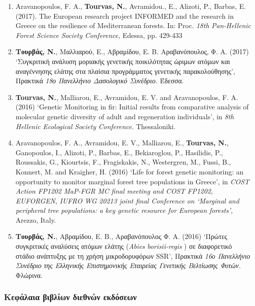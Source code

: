 \documentclass[12pt,]{scrartcl}
\begin{document}
\begin{enumerate}
\leftskip-0.07in  
\item {Aravanopoulos, F. Α., \textbf{Tourvas, N.}, Avramidou., E., Alizoti, P., Barbas, E. (2017). The European research project INFORMED and the research in Greece on the resilience of Mediterranean forests. In: Proc. \textit{18th Pan-Hellenic Forest Science Society Conference,} Edessa, pp. 429-433}
 
\leftskip-0.07in  
\item {\textbf{Τουρβάς, Ν.}, Μαλλιαρού, E., Αβραμίδου, Ε. Β. Αραβανόπουλος, Φ. Α. (2017) ‘Συγκριτική ανάλυση μοριακής γενετικής ποικιλότητας ώριμων ατόμων και αναγέννησης ελάτης στα πλαίσια προγράμματος γενετικής παρακολούθησης’, Πρακτικά \textit{18ο Πανελλήνιο Δασολογικό Συνέδριο.} Έδεσσα.}

\leftskip-0.07in  
\item {\textbf{Tourvas, N.}, Malliarou, E., Avramidou, E. V. and Aravanopoulos, F. A. (2016) ‘Genetic Monitoring in fir: Initial results from comparative analysis of molecular genetic diversity of adult and regeneration individuals’, in \textit{8th Hellenic Ecological Society Conference.} Thessaloniki.}

\leftskip-0.07in  
\item {Aravanopoulos, F. A., Avramidou, E. V., Malliarou, E., \textbf{Tourvas, N.}, Ganopoulos, I., Alizoti, P., Barbas, E., Bekiaroglou, P., Hasilidis, P., Roussakis, G., Kiourtsis, F., Fragiskakis, N., Westergren, M., Fussi, B., Konnert, M. and Kraigher, H. (2016) ‘Life for forest genetic monitoring: an opportunity to monitor marginal forest tree populations in Greece’, in \textit{COST Action FP1202 MaP-FGR MC final meeting and COST FP1202, EUFORGEN, IUFRO WG 20213 joint final Conference on ‘Marginal and peripheral tree populations: a key genetic resource for European forests’,} Arezzo, Italy.}

\leftskip-0.07in  
\item {\textbf{Τουρβάς, Ν.}, Αβραμίδου, Ε. Β., Αραβανόπουλος Φ. Α. (2016) ‘Πρώτες συγκριτικές αναλύσεις ατόμων ελάτης (\textit{Abies borisii-regis}
) σε διαφορετικό στάδιο ανάπτυξης με τη χρήση μικροδορυφόρων SSR’, Πρακτικά \textit{16ο Πανελλήνιο Συνέδριο της Ελληνικής Επιστημονικής Εταιρείας Γενετικής Βελτίωσης Φυτών.} Φλώρινα.}

\end{enumerate}


\subsubsection{Κεφάλαια βιβλίων διεθνών εκδόσεων}\label{book-chapters}
\end{document}
